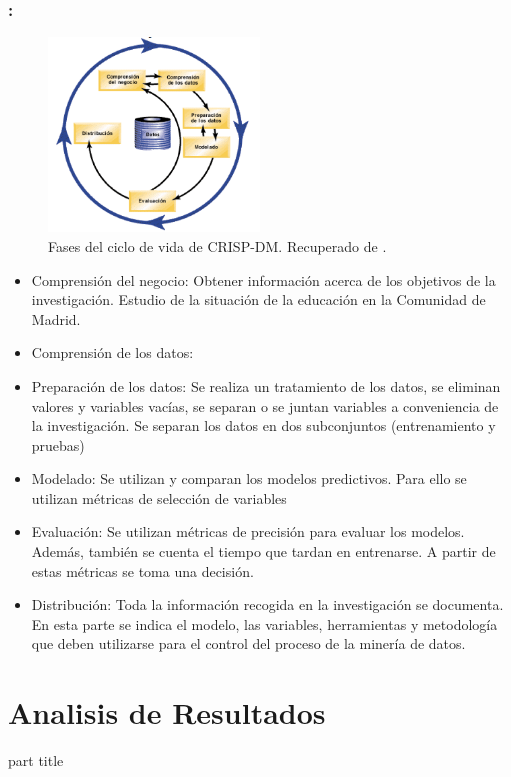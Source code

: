 \documentclass{beamer}
\begin{document}
\begin{frame}[allowframebreaks=1]
\frametitle{\secname : \subsecname}
	\begin{figure}[htb]
	\centering
	\caption{Fases del ciclo de vida de CRISP-DM. Recuperado de \protect{}.}
	\includegraphics[width=0.5\textwidth]{../TemplateTFM/recursos/CRISPCicloIBM}
	\end{figure}
		\begin{itemize}
	\item Comprensión del negocio: Obtener información acerca de los objetivos de la investigación. Estudio de la situación de la educación en la Comunidad de Madrid.
	\item Comprensión de los datos:
	\item Preparación de los datos: Se realiza un tratamiento de los datos, se eliminan valores y variables vacías, se separan o se juntan variables a conveniencia de la investigación. Se separan los datos en dos subconjuntos (entrenamiento y pruebas)
	\item Modelado: Se utilizan y comparan los modelos predictivos. Para ello se utilizan métricas de selección de variables
	\item Evaluación: Se utilizan métricas de precisión para evaluar los modelos. Además, también se cuenta el tiempo que tardan en entrenarse. A partir de estas métricas se toma una decisión.
	\item Distribución: Toda la información recogida en la investigación se documenta. En esta parte se indica el modelo, las variables, herramientas y metodología que deben utilizarse para el control del proceso de la minería de datos.
\end{itemize}
\end{frame}

\section{Analisis de Resultados}
\begin{frame}
\begin{center}
	\begin{beamercolorbox}[
		sep=8pt,center,rounded=true,shadow=true]{part title}
		\secname
	\end{beamercolorbox}
\end{center}
\end{frame}
\end{document}

